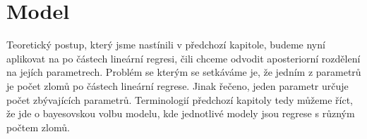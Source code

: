 \documentclass[czech,master,public,dept470,male,cpdeclaration,oneside, python]{diploma}
\begin{document}
%
\section{Model}
Teoretický postup, který jsme nastínili v předchozí kapitole, budeme nyní aplikovat na po částech lineární regresi, čili chceme odvodit aposteriorní rozdělení na jejích parametrech. Problém se kterým se setkáváme je, že jedním z parametrů je počet zlomů po částech lineární regrese. Jinak řečeno, jeden parametr určuje počet zbývajících parametrů. Terminologií předchozí kapitoly tedy můžeme říct, že jde o bayesovskou volbu modelu, kde jednotlivé modely jsou regrese s různým počtem zlomů.
\par \par
\end{document}
